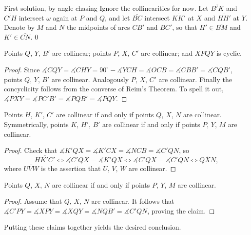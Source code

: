 \begin{customenv}{First solution, by angle chasing}
    Ignore the collinearities for now. Let $\overline{B'K}$ and $\overline{C'H}$ intersect $\omega$ again at $P$ and $Q$, and let $\overline{BC}$ intersect $\overline{KK'}$ at $X$ and $\overline{HH'}$ at $Y$. Denote by $M$ and $N$ the midpoints of arcs $CB'$ and $BC'$, so that $H'\in\overline{BM}$ and $K'\in\overline{CN}$.
    \setcounter{iclaim}0
    \begin{iclaim}
        Points $Q$, $Y$, $B'$ are collinear; points $P$, $X$, $C'$ are collinear; and $XPQY$ is cyclic.
    \end{iclaim}
    \begin{proof}
        Since $\measuredangle CQY=\measuredangle CHY=90^{\circ}-\measuredangle YCH=\measuredangle OCB=\measuredangle CBB'=\measuredangle CQB'$, points $Q$, $Y$, $B'$ are collinear. Analogously $P$, $X$, $C'$ are collinear. Finally the concyclicity follows from the converse of Reim's Theorem. To spell it out, $\measuredangle PXY=\measuredangle PC'B'=\measuredangle PQB'=\measuredangle PQY$.
    \end{proof}
    \begin{iclaim}
        Points $H$, $K'$, $C'$ are collinear if and only if points $Q$, $X$, $N$ are collinear. Symmetrically, points $K$, $H'$, $B'$ are collinear if and only if points $P$, $Y$, $M$ are collinear.
    \end{iclaim}
    \begin{proof}
        Check that $\measuredangle K'QX=\measuredangle K'CX=\measuredangle NCB=\measuredangle C'QN$, so \[\overline{HK'C'}\iff\measuredangle C'QX=\measuredangle K'QX\iff\measuredangle C'QX=\measuredangle C'QN\iff\overline{QXN},\]
        where $\overline{UVW}$ is the assertion that $U$, $V$, $W$ are collinear.
    \end{proof}
    \begin{iclaim}
        Points $Q$, $X$, $N$ are collinear if and only if points $P$, $Y$, $M$ are collinear.
    \end{iclaim}
    \begin{proof}
        Assume that $Q$, $X$, $N$ are collinear. It follows that $\measuredangle C'PY=\measuredangle XPY=\measuredangle XQY=\measuredangle NQB'=\measuredangle C'QN$, proving the claim.
    \end{proof}

    Putting these claims together yields the desired conclusion.
\end{customenv}
